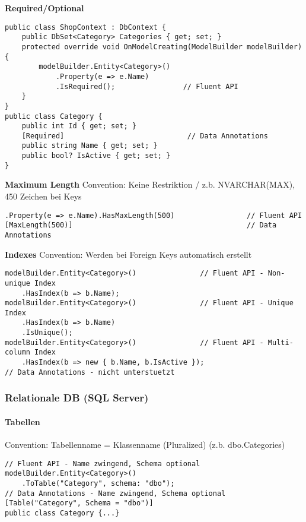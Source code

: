 \textbf{Required/Optional}
\begin{lstlisting}
public class ShopContext : DbContext {
    public DbSet<Category> Categories { get; set; }
    protected override void OnModelCreating(ModelBuilder modelBuilder) {
        modelBuilder.Entity<Category>()
            .Property(e => e.Name)
            .IsRequired();                // Fluent API
    }
}
public class Category {
    public int Id { get; set; }
    [Required]                             // Data Annotations
    public string Name { get; set; }
    public bool? IsActive { get; set; }
}
\end{lstlisting}

\textbf{Maximum Length}
Convention: Keine Restriktion / z.b. NVARCHAR(MAX), 450 Zeichen bei Keys
\begin{lstlisting}
.Property(e => e.Name).HasMaxLength(500)                 // Fluent API
[MaxLength(500)]                                         // Data Annotations
\end{lstlisting}

\textbf{Indexes} 
Convention: Werden bei Foreign Keys automatisch erstellt
\begin{lstlisting} 
modelBuilder.Entity<Category>()               // Fluent API - Non-unique Index
    .HasIndex(b => b.Name);
modelBuilder.Entity<Category>()               // Fluent API - Unique Index
    .HasIndex(b => b.Name)
    .IsUnique();
modelBuilder.Entity<Category>()               // Fluent API - Multi-column Index
    .HasIndex(b => new { b.Name, b.IsActive });
// Data Annotations - nicht unterstuetzt
\end{lstlisting}

\subsubsection{Relationale DB (SQL Server)}
\paragraph{Tabellen} Convention: Tabellenname = Klassenname (Pluralized) (z.b. dbo.Categories)
\begin{lstlisting}
// Fluent API - Name zwingend, Schema optional
modelBuilder.Entity<Category>()                         
    .ToTable("Category", schema: "dbo");
// Data Annotations - Name zwingend, Schema optional
[Table("Category", Schema = "dbo")]                     
public class Category {...}
\end{lstlisting}


